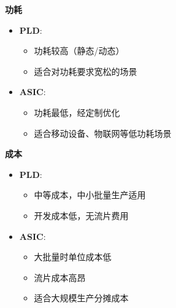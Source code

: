 \documentclass{beamer}
\providecommand{\tightlist}{%
  \setlength{\itemsep}{0pt}\setlength{\parskip}{0pt}}
\begin{document}
\begin{frame}{\textbf{功耗}}

\begin{itemize}
\tightlist
\item
    \textbf{PLD}:

    \begin{itemize}
    \tightlist
    \item
    功耗较高（静态/动态）\\
    \item
    适合对功耗要求宽松的场景\\
    \end{itemize}
\item
    \textbf{ASIC}:

    \begin{itemize}
    \tightlist
    \item
    功耗最低，经定制优化\\
    \item
    适合移动设备、物联网等低功耗场景
    \end{itemize}
\end{itemize}
\end{frame}

\begin{frame}{\textbf{成本}}

\begin{itemize}
\tightlist
\item
    \textbf{PLD}:

    \begin{itemize}
    \tightlist
    \item
    中等成本，中小批量生产适用\\
    \item
    开发成本低，无流片费用\\
    \end{itemize}
\item
    \textbf{ASIC}:

    \begin{itemize}
    \tightlist
    \item
    大批量时单位成本低\\
    \item
    流片成本高昂\\
    \item
    适合大规模生产分摊成本
    \end{itemize}
\end{itemize}
\end{frame}
\end{document}
